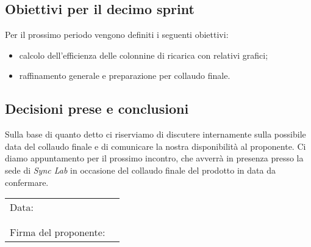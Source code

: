 \documentclass[italian,12pt]{article}
\begin{document}
\subsection{Obiettivi per il decimo sprint}
Per il prossimo periodo vengono definiti i seguenti obiettivi:
\begin{itemize}
	\item calcolo dell'efficienza delle colonnine di ricarica con relativi grafici;
	\item raffinamento generale e preparazione per collaudo finale.
\end{itemize}

\newpage

\subsection{Decisioni prese e conclusioni}
Sulla base di quanto detto ci riserviamo di discutere internamente sulla possibile data del collaudo finale e di comunicare la nostra disponibilità al proponente. Ci diamo appuntamento per il prossimo incontro, che avverrà in presenza presso la sede di \textit{Sync Lab} in occasione del collaudo finale del prodotto in data da confermare.

\begin{table}[b]
	\begin{tabular}{@{}p{5cm}p{10cm}@{}}
		Data:                 & \hrulefill \\
		                      &            \\
		                      &            \\
		Firma del proponente: & \hrulefill \\
	\end{tabular}
\end{table}
\end{document}
